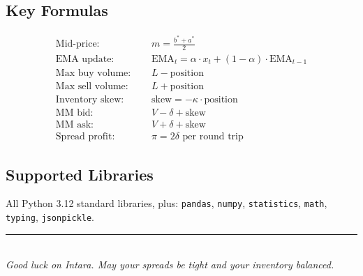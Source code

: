 \documentclass[11pt, letterpaper]{article}
\begin{document}
\subsection{Key Formulas}

\begin{align}
    \text{Mid-price: } &\quad m = \frac{b^* + a^*}{2} \\[4pt]
    \text{EMA update: } &\quad \text{EMA}_t = \alpha \cdot x_t + (1-\alpha) \cdot \text{EMA}_{t-1} \\[4pt]
    \text{Max buy volume: } &\quad L - \text{position} \\[4pt]
    \text{Max sell volume: } &\quad L + \text{position} \\[4pt]
    \text{Inventory skew: } &\quad \text{skew} = -\kappa \cdot \text{position} \\[4pt]
    \text{MM bid: } &\quad V - \delta + \text{skew} \\[4pt]
    \text{MM ask: } &\quad V + \delta + \text{skew} \\[4pt]
    \text{Spread profit: } &\quad \pi = 2\delta \text{ per round trip}
\end{align}

\subsection{Supported Libraries}

All Python 3.12 standard libraries, plus: \texttt{pandas}, \texttt{numpy}, \texttt{statistics}, \texttt{math}, \texttt{typing}, \texttt{jsonpickle}.

\vfill
\begin{center}
\rule{0.5\textwidth}{0.4pt} \\[6pt]
\textit{Good luck on Intara. May your spreads be tight and your inventory balanced.}
\end{center}
\end{document}
